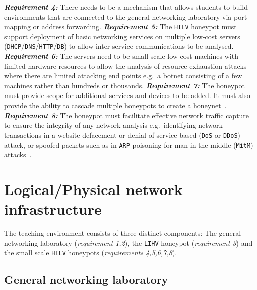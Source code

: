 \noindent \emph{\textbf{Requirement 4:}} There needs to be a mechanism that
allows students to build environments that are connected to the general
networking laboratory via port mapping or address forwarding.  \newline\newline
\noindent \emph{\textbf{Requirement 5:}} The \texttt{HILV} honeypot must
support deployment of basic networking services on multiple low-cost servers
(\texttt{DHCP}/\texttt{DNS}/\texttt{HTTP}/\texttt{DB}) to allow inter-service
communications to be analysed.  \newline\newline \noindent
\emph{\textbf{Requirement 6:}} The servers need to be small scale low-cost
machines with limited hardware resources to allow the analysis of resource
exhaustion attacks where there are limited attacking end points e.g.\ a botnet
consisting of a few machines rather than hundreds or thousands.
\newline\newline \noindent \emph{\textbf{Requirement 7:}} The honeypot must
provide scope for additional services and devices to be added. It must also
provide the ability to cascade multiple honeypots to create a
honeynet~\cite{AA:15,FDF:15,KNC:15}.  \newline\newline \noindent
\emph{\textbf{Requirement 8:}} The honeypot must facilitate effective network
traffic capture to ensure the integrity of any network analysis e.g.\ 
identifying network transactions in a website defacement or denial of
service-based (\texttt{DoS} or \texttt{DDoS}) attack, or spoofed packets such
as in \texttt{ARP} poisoning for man-in-the-middle (\texttt{MitM})
attacks~\cite{PS:16,RSKA:16}.

\section{Logical/Physical network infrastructure}\label{LogicalDesign}

The teaching environment consists of three distinct components: The general
networking laboratory (\textit{requirement 1,2}), the \texttt{LIHV} honeypot
(\textit{requirement 3}) and the small scale \texttt{HILV} honeypots
(\textit{requirements 4,5,6,7,8}).

\subsection{General networking laboratory}

